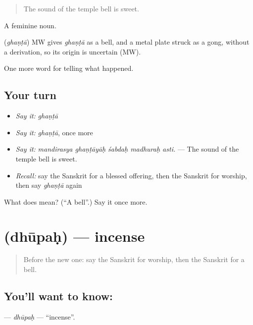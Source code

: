 \begin{quote}
The sound of the temple bell is sweet.
\end{quote}

A feminine noun.

\begin{cousinweb}
\textbf{} (\emph{ghaṇṭā}) MW gives \emph{ghaṇṭā} as a bell, and a metal plate struck as a gong, without a derivation, so its origin is uncertain (MW).
\end{cousinweb}

\begin{grammarlens}[title={What you've built}]
One more word for telling what happened.
\end{grammarlens}

\subsection*{Your turn}
\begin{itemize}
\raggedright
  \item \emph{Say it:} \emph{ghaṇṭā}
  \item \emph{Say it:} \emph{ghaṇṭā}, once more
  \item \emph{Say it:} \emph{mandirasya ghaṇṭāyāḥ śabdaḥ madhuraḥ asti.} — The sound of the temple bell is sweet.
  \item \emph{Recall:} say the Sanskrit for a blessed offering, then the Sanskrit for worship, then say \emph{ghaṇṭā} again
\end{itemize}

\begin{tcolorbox}[breakable,colback=teal!4,colframe=teal!35!black,title={Before you move on}]
What does  mean? (\textquotedblleft{}A bell\textquotedblright{}.) Say it once more.
\end{tcolorbox}
\section[\texorpdfstring{\sk{धूपः} (dhūpaḥ)}{धूपः (dhūpaḥ)}]{ (dhūpaḥ) — incense}

\label{lesson:SA-C329-dhupah}



\begin{quote}
Before the new one: say the Sanskrit for worship, then the Sanskrit for a bell.
\end{quote}

\subsection*{You'll want to know: }
\textbf{} — \emph{dhūpaḥ} — \textquotedblleft{}incense\textquotedblright{}.

